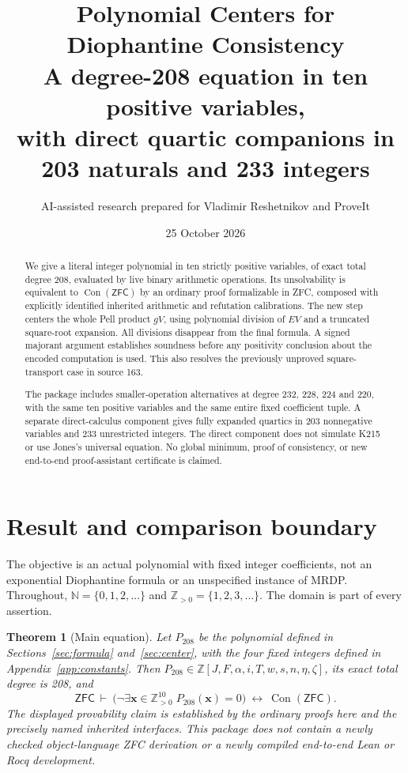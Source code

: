 \documentclass[11pt]{article}
\title{Polynomial Centers for Diophantine Consistency\\[0.4em]
\large A degree-208 equation in ten positive variables,\\
with direct quartic companions in 203 naturals and 233 integers}
\author{AI-assisted research prepared for Vladimir Reshetnikov and ProveIt}
\date{25 October 2026}
\newtheorem{theorem}{Theorem}[section]
\theoremstyle{remark}\newtheorem{remark}[theorem]{Remark}
\newcommand{\Z}{\mathbb Z}\newcommand{\N}{\mathbb N}
\newcommand{\Pos}{\mathbb Z_{>0}}
\newcommand{\Con}{\operatorname{Con}}
\newcommand{\ZFC}{\mathsf{ZFC}}\newcommand{\ZF}{\mathsf{ZF}}
\begin{document}
\maketitle
\begin{abstract}
We give a literal integer polynomial in ten strictly positive variables,
of exact total degree 208, evaluated by \PrimaryOps{} live binary arithmetic
operations. Its unsolvability is equivalent to $\Con(\ZFC)$ by an ordinary
proof formalizable in ZFC, composed with explicitly identified inherited
arithmetic and refutation calibrations. The new step centers the whole Pell
product $gV$, using polynomial division of $EV$ and a truncated square-root
expansion. All divisions disappear from the final formula. A signed
majorant argument establishes soundness before any positivity conclusion
about the encoded computation is used. This also resolves the previously
unproved square-transport case in source 163.

The package includes smaller-operation alternatives at degree 232, 228,
224 and 220, with the same ten positive variables and the same entire
fixed coefficient tuple. A separate direct-calculus component gives fully
expanded quartics in 203 nonnegative variables and 233 unrestricted
integers. The direct component does not simulate K215 or use Jones's
universal equation. No global minimum, proof of consistency, or new
end-to-end proof-assistant certificate is claimed.
\end{abstract}
\clearpage
\setcounter{tocdepth}{1}
\tableofcontents
\clearpage

\section{Result and comparison boundary}

The objective is an actual polynomial with fixed integer coefficients,
not an exponential Diophantine formula or an unspecified instance of MRDP.
Throughout, $\N=\{0,1,2,\ldots\}$ and $\Pos=\{1,2,3,\ldots\}$.
The domain is part of every assertion.

\begin{theorem}[Main equation]\label{thm:main}
Let $P_{208}$ be the polynomial defined in Sections~\ref{sec:formula}
and~\ref{sec:center}, with the four fixed integers defined in
Appendix~\ref{app:constants}. Then $P_{208}\in\Z[J,F,\alpha,i,T,w,s,n,\eta,\zeta]$,
its exact total degree is 208, and
\[
 \ZFC\ \vdash\
 \bigl(\neg\exists\mathbf x\in\Pos^{10}\;P_{208}(\mathbf x)=0\bigr)
 \ \longleftrightarrow\ \Con(\ZFC).
\]
The displayed provability claim is established by the ordinary proofs here and
the precisely named inherited interfaces. This package does not contain
a newly checked object-language ZFC derivation or a newly compiled
end-to-end Lean or Rocq development.
\end{theorem}
\end{document}
